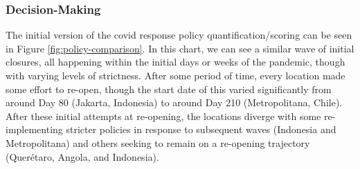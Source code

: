 %
%

\subsubsection{Decision-Making} \label{sec:vida-evdt-decision-results}

The initial version of the \ac{covid} response policy quantification/scoring can be seen in Figure \ref{fig:policy-comparison}. In this chart, we can see a similar wave of initial closures, all happening within the initial days or weeks of the pandemic, though with varying levels of strictness. After some period of time, every location made some effort to re-open, though the start date of this varied significantly from around Day 80 (Jakarta, Indonesia) to around Day 210 (Metropolitana, Chile). After these initial attempts at re-opening, the locations diverge with some re-implementing stricter policies in response to subsequent waves (Indonesia and Metropolitana) and others seeking to remain on a re-opening trajectory (Querétaro, Angola, and Indonesia).

